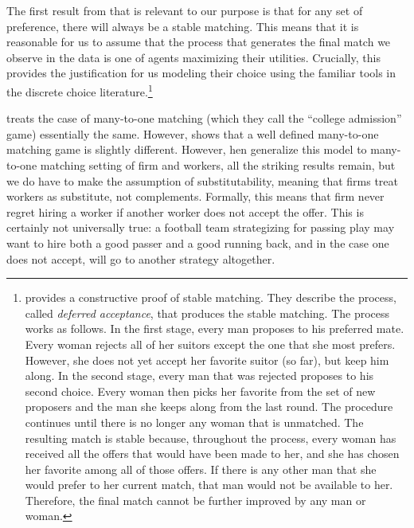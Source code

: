 The first result from \citep{Gale1962} that is relevant to our purpose is that
for any set of preference, there will always be a stable matching. This means
that it is reasonable for us to assume that the process that generates the final
match we observe in the data is one of agents maximizing their utilities.
Crucially, this provides the justification for us modeling their choice using the familiar tools in the
discrete choice literature.\footnote{\citep{Gale1962} provides a constructive
  proof of stable matching. They describe the process, called
  \textit{deferred acceptance}, that produces the stable matching. The process
  works as follows. In the first stage, every man proposes to his preferred mate. Every
  woman rejects all of her suitors except the one that she most prefers.
  However, she does not yet accept her favorite suitor (so far), but keep him along. In the
  second stage, every man that was rejected proposes to his second choice. Every
  woman then picks her favorite from the set of new proposers and the man she
  keeps along from the last round. The procedure continues until there is no longer any
woman that is unmatched. The resulting match is stable because, throughout the process, every woman has received all
the offers that would have been made to her, and she has chosen her favorite
among all of those offers. If there is any other man that she would prefer to
her current match, that man would not be available to her. Therefore, the final match cannot be further improved
by any man or woman.}

\citep{Gale1962} treats the case of many-to-one matching (which they call the
``college admission'' game) essentially the same. However, \cite{Roth1992} shows
that a well defined many-to-one matching game is slightly different. However, hen generalize this model to many-to-one matching setting of firm and workers,
all the striking results remain, but we do have to make the assumption of
substitutability, meaning that firms treat workers as substitute, not
complements. Formally, this means that firm never regret hiring a worker if
another worker does not accept the offer. This is certainly not universally
true: a football team strategizing for passing play may want to hire both a good
passer and a good running back, and in the case one does not accept, will go to
another strategy altogether.

